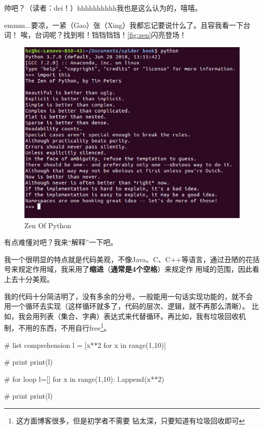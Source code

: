 \documentclass[11pt,UTF8,oneside]{mybook}
\begin{document}
帅吧？（读者：dei！）hhhhhhhhhh我也是这么认为的，嘻嘻。

emmm...要凉，一紧（Gao）张（Xing）我都忘记要说什么了。且容我看一下台词！
唉，台词呢？找到啦！铛铛铛铛！\autoref{fig:zen}闪亮登场！

\begin{figure}[htb]
  \centering \includegraphics[width=\textwidth]{./figure/zen.png}
  \caption{Zen Of Python}
  \label{fig:zen}
\end{figure}

有点难懂对吧？我来“解释”一下吧。


我一个很明显的特点就是代码美观，不像Java、C、C++等语言，通过丑陋的花括
号来规定作用域，我采用了\textbf{缩进}（\textbf{通常是4个空格}）来规定作
用域的范围，因此看上去十分美观。

我的代码十分简洁明了，没有多余的分号。一般能用一句话实现功能的，就不会
用一个循环去实现（这样循环就多了，代码的层次、逻辑，就不再那么清晰）。
比如，我会用列表（集合、字典）表达式来代替循环。再比如，我有垃圾回收机
制，不用的东西，不用自行free\footnote{这方面博客很多，但是初学者不需要
  钻太深，只要知道有垃圾回收即可}。

\begin{python}
  # list comprehension l = [x**2 for x in range(1,10)]

  # print print(l)

  # for loop l=[] for x in range(1,10): l.append(x**2)

  # print print(l)
\end{python}
\end{document}
